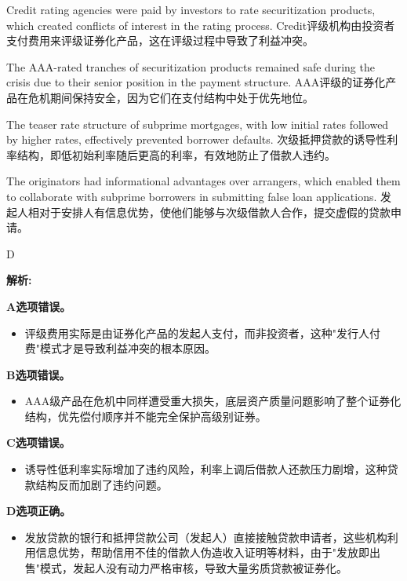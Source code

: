 \documentclass{article}
\newenvironment{explanation}
{\textbf{解析:}\par}
{\par}
\begin{document}
        \begin{choices}
            \item Credit rating agencies were paid by investors to rate securitization products, which created conflicts of interest in the rating process.
            Credit评级机构由投资者支付费用来评级证券化产品，这在评级过程中导致了利益冲突。
            \item The AAA-rated tranches of securitization products remained safe during the crisis due to their senior position in the payment structure.
            AAA评级的证券化产品在危机期间保持安全，因为它们在支付结构中处于优先地位。
            \item The teaser rate structure of subprime mortgages, with low initial rates followed by higher rates, effectively prevented borrower defaults.
            次级抵押贷款的诱导性利率结构，即低初始利率随后更高的利率，有效地防止了借款人违约。
            \item The originators had informational advantages over arrangers, which enabled them to collaborate with subprime borrowers in submitting false loan applications.
            发起人相对于安排人有信息优势，使他们能够与次级借款人合作，提交虚假的贷款申请。
        \end{choices}
        
        \begin{correctanswer}
        D
        \end{correctanswer}
        
        \begin{explanation}
            \textbf{A选项错误。}
            \begin{itemize}
                \item 评级费用实际是由证券化产品的发起人支付，而非投资者，这种"发行人付费"模式才是导致利益冲突的根本原因。
            \end{itemize}
            
            \textbf{B选项错误。}
            \begin{itemize}
                \item AAA级产品在危机中同样遭受重大损失，底层资产质量问题影响了整个证券化结构，优先偿付顺序并不能完全保护高级别证券。
            \end{itemize}
            
            \textbf{C选项错误。}
            \begin{itemize}
                \item 诱导性低利率实际增加了违约风险，利率上调后借款人还款压力剧增，这种贷款结构反而加剧了违约问题。
            \end{itemize}
            
            \textbf{D选项正确。}
            \begin{itemize}
                \item 发放贷款的银行和抵押贷款公司（发起人）直接接触贷款申请者，这些机构利用信息优势，帮助信用不佳的借款人伪造收入证明等材料，由于"发放即出售"模式，发起人没有动力严格审核，导致大量劣质贷款被证券化。
            \end{itemize}
        \end{explanation}
        
\end{document}
